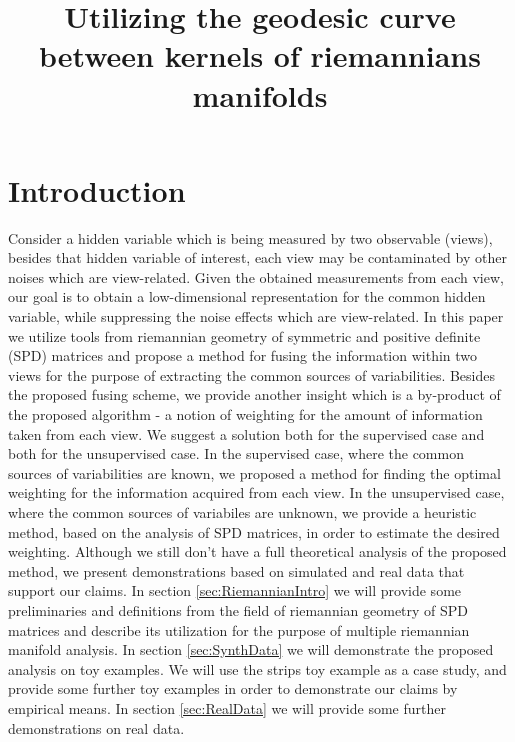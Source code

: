 \documentclass[]{article}
\theoremstyle{definition}
\begin{document}
	
	\title{Utilizing the geodesic curve between kernels of riemannians manifolds}
	\maketitle
	
	\section{Introduction}
	Consider a hidden variable which is being measured by two observable (views), besides that hidden variable of interest, each view may be contaminated by other noises which are view-related. 
	Given the obtained measurements from each view, our goal is to obtain a low-dimensional representation for the common hidden variable, while suppressing the noise effects which are view-related.
	In this paper we utilize tools from riemannian geometry of symmetric and positive definite (SPD) matrices and propose a method for fusing the information within two views for the purpose of extracting the common sources of variabilities. Besides the proposed fusing scheme, we provide another insight which is a by-product of the proposed algorithm - a notion of weighting for the amount of information taken from each view.
	We suggest a solution both for the supervised case and both for the unsupervised case.
	In the supervised case, where the common sources of variabilities are known, we proposed a method for finding the optimal weighting for the information acquired from each view.
	In the unsupervised case, where the common sources of variabiles are unknown, we provide a heuristic method, based on the analysis of SPD matrices, in order to estimate the desired weighting.
	Although we still don't have a full theoretical analysis of the proposed method, we present demonstrations based on simulated and real data that support our claims.
	In section \ref{sec:RiemannianIntro} we will provide some preliminaries and definitions from the field of riemannian geometry of SPD matrices and describe its utilization for the purpose of multiple riemannian manifold analysis.
	In section \ref{sec:SynthData} we will demonstrate the proposed analysis on toy examples. We will use the strips toy example as a case study, and provide some further toy examples in order to demonstrate our claims by empirical means. In section \ref{sec:RealData} we will provide some further demonstrations on real data.
	
\end{document}
